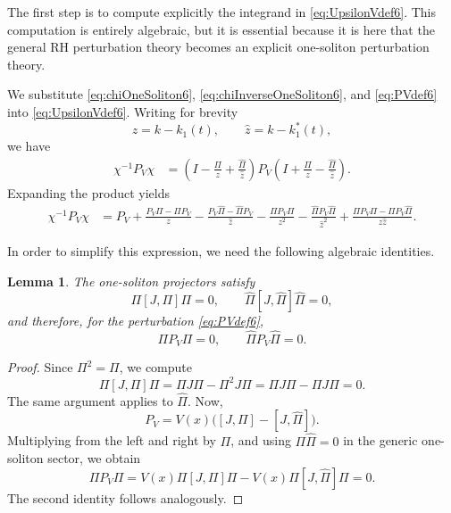 \documentclass[11pt]{amsart}
\newtheorem{lemma}{Lemma}[section]
\theoremstyle{definition}
\numberwithin{equation}{section}
\begin{document}
The first step is to compute explicitly the integrand in \eqref{eq:UpsilonVdef6}. This computation is entirely algebraic, but it is essential because it is here that the general RH perturbation theory becomes an explicit one-soliton perturbation theory.

We substitute \eqref{eq:chiOneSoliton6}, \eqref{eq:chiInverseOneSoliton6}, and \eqref{eq:PVdef6} into \eqref{eq:UpsilonVdef6}. Writing for brevity
\[
z=k-k_1(t), \qquad \widehat z = k-k_1^*(t),
\]
we have
\begin{align}
\chi^{-1}P_V\chi
&=
\left(I-\frac{\Pi}{z}+\frac{\widehat\Pi}{\widehat z}\right)
P_V
\left(I+\frac{\Pi}{z}-\frac{\widehat\Pi}{\widehat z}\right).
\label{eq:rawexpansion6}
\end{align}
Expanding the product yields
\begin{align}
\chi^{-1}P_V\chi
&=
P_V
+\frac{P_V\Pi-\Pi P_V}{z}
-\frac{P_V\widehat\Pi-\widehat\Pi P_V}{\widehat z}
-\frac{\Pi P_V\Pi}{z^2}
-\frac{\widehat\Pi P_V\widehat\Pi}{\widehat z^2}
+\frac{\widehat\Pi P_V\Pi-\Pi P_V\widehat\Pi}{z\widehat z}.
\label{eq:expandedIntegrand6}
\end{align}

In order to simplify this expression, we need the following algebraic identities.

\begin{lemma}
The one-soliton projectors satisfy
\begin{equation}
\Pi[J,\Pi]\Pi=0,
\qquad
\widehat\Pi[J,\widehat\Pi]\widehat\Pi=0,
\label{eq:tripleprojector6}
\end{equation}
and therefore, for the perturbation \eqref{eq:PVdef6},
\begin{equation}
\Pi P_V \Pi = 0,
\qquad
\widehat\Pi P_V \widehat\Pi=0.
\label{eq:PiPVPi6}
\end{equation}
\end{lemma}

\begin{proof}
Since $\Pi^2=\Pi$, we compute
\[
\Pi[J,\Pi]\Pi
=
\Pi J\Pi-\Pi^2 J\Pi
=
\Pi J\Pi-\Pi J\Pi
=
0.
\]
The same argument applies to $\widehat\Pi$. Now,
\[
P_V=V(x)\bigl([J,\Pi]-[J,\widehat\Pi]\bigr).
\]
Multiplying from the left and right by $\Pi$, and using $\Pi\widehat\Pi=0$ in the generic one-soliton sector, we obtain
\[
\Pi P_V\Pi
=
V(x)\Pi[J,\Pi]\Pi
-
V(x)\Pi[J,\widehat\Pi]\Pi
=
0.
\]
The second identity follows analogously.
\end{proof}
\end{document}
